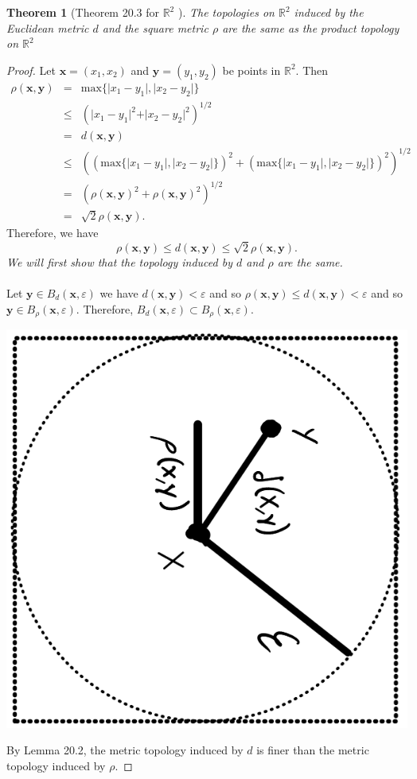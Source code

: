 \documentclass[12pt]{report}
\newtheorem{theorem}{Theorem}
\newcommand{\R}{\mathbb{R}^2}
\newcommand{\x}{\mathbf{x}}
\newcommand{\y}{\mathbf{y}}
\newcommand{\m}{\text{max}}
\begin{document}
\begin{theorem}[Theorem 20.3 for $\R$ ]
The topologies on $\R$ induced by the Euclidean metric $d$ and the square metric $\rho$ are the same as the product topology on $\R$
\end{theorem}
\begin{proof}
Let $\x = (x_1,x_2)$ and $\y= (y_1,y_2)$ be points in $\R$. Then
\begin{eqnarray*}
\rho(\x, \y) &=&  \m \{ \vert x_1- y_1 \vert , \vert x_2- y_2 \vert \} \\
&\leq& \left(  \vert x_1 -y_1 \vert^2 +\vert x_2 -y_2 \vert^2 \right)^{1/2}\\ &=& d(\x,\y)\\
&\leq& \left(  (\m \{ \vert x_1- y_1 \vert , \vert x_2- y_2 \vert \} )^2 +(\m \{ \vert x_1- y_1 \vert , \vert x_2- y_2 \vert \} )^2 \right)^{1/2}\\
&=& (\rho(\x,\y)^2+ \rho(\x,\y)^2)^{1/2}\\ 
&=& \sqrt{2} \rho(\x,\y).
\end{eqnarray*}
Therefore, we have 
\begin{equation}
\rho(\x,\y) \leq d(\x,\y) \leq \sqrt{2}\rho(\x,\y).
\end{equation}
\emph{We will first show that the topology induced by $d$ and $\rho$ are the same.}\\\\
Let $\y \in B_d(\x, \varepsilon)$ we have $d(\x,\y) < \varepsilon$ and so $\rho(\x,\y) \leq d(\x,\y) < \varepsilon$ and so $\y \in B_\rho (\x, \varepsilon)$. Therefore, $B_d(\x, \varepsilon) \subset B_\rho(\x, \varepsilon)$. 


\begin{center}
	\includegraphics[scale=.5,angle=90]{pic1.png}
\end{center}
By Lemma 20.2, the metric topology induced by $d$ is finer than the metric topology induced by $\rho$.


\end{proof}
\end{document}
